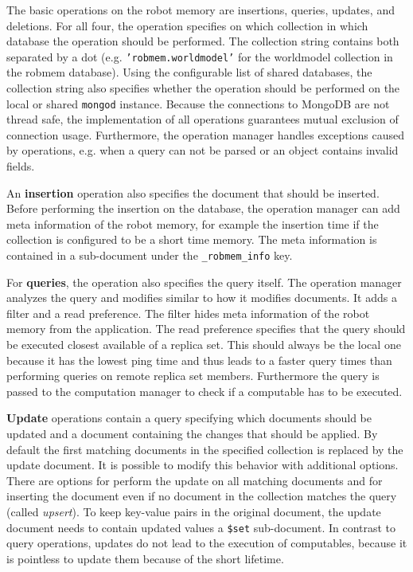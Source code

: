 The basic operations on the robot memory are insertions, queries,
updates, and deletions. For all four, the operation specifies on which
collection in which database the operation should be performed. The
collection string contains both separated by a dot
(e.g. \texttt{'robmem.worldmodel'} for the worldmodel collection in
the robmem database).   Using
the configurable list of shared databases, the collection string also
specifies whether the operation should be performed on the local or
shared \texttt{mongod} instance. Because the connections to MongoDB
are not thread safe, the implementation of all operations guarantees
mutual exclusion of connection usage. Furthermore, the operation
manager handles exceptions caused by operations, e.g. when a query can
not be parsed or an object contains invalid fields.

An \textbf{insertion} operation also specifies the document that
should be inserted. Before performing the insertion on the database,
the operation manager can add meta information of the robot memory,
for example the insertion time if the collection is configured to be a
short time memory. The meta information is contained in a sub-document
under the \texttt{\_robmem\_info} key.

For \textbf{queries}, the operation also specifies the query
itself. The operation manager analyzes the query and modifies similar
to how it modifies documents. It adds a filter and a read
preference. The filter hides meta information of the robot memory from
the application. The read preference specifies that the query should
be executed closest available of a replica set. This should always be
the local one because it has the lowest ping time and thus leads to a
faster query times than performing queries on remote replica set
members. Furthermore the query is passed to the computation manager to
check if a computable has to be executed.

\textbf{Update} operations contain a query specifying which documents
should be updated and a document containing the changes that should be
applied. By default the first matching documents in the specified
collection is replaced by the update document. It is possible to
modify this behavior with additional options. There are options for
perform the update on all matching documents and for inserting the
document even if no document in the collection matches the query
(called \emph{upsert}). To keep key-value pairs in the original
document, the update document needs to contain updated values a
\texttt{\$set} sub-document. In contrast to
query operations, updates do not lead to the execution of computables,
because it is pointless to update them because of the short lifetime.

